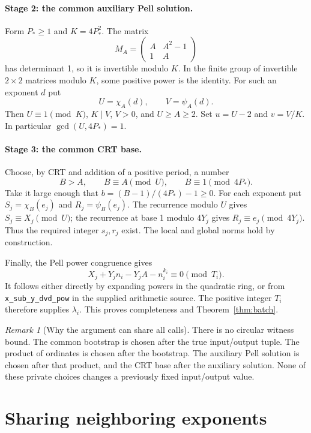 \documentclass[11pt]{article}
\theoremstyle{definition}
\theoremstyle{remark}
\newtheorem{remark}[theorem]{Remark}
\newcommand{\File}[1]{\nolinkurl{#1}}
\begin{document}
\paragraph{Stage 2: the common auxiliary Pell solution.}
Form $P_*\ge1$ and $K=4P_*^2$. The matrix
\[
 M_A=\begin{pmatrix} A&A^2-1\\1&A\end{pmatrix}
\]
has determinant 1, so it is invertible modulo $K$. In the finite group
of invertible $2\times2$ matrices modulo $K$, some positive power is
the identity. For such an exponent $d$ put
\[
 U=\chi_A(d),\qquad V=\psi_A(d).
\]
Then $U\equiv1\pmod K$, $K\mid V$, $V>0$, and $U\ge A\ge2$.
Set $u=U-2$ and $v=V/K$. In particular
$\gcd(U,4P_*)=1$.

\paragraph{Stage 3: the common CRT base.}
Choose, by CRT and addition of a positive period, a number
\[
 B>A,\qquad B\equiv A\pmod U,\qquad B\equiv1\pmod{4P_*}.
\]
Take it large enough that $b=(B-1)/(4P_*)-1\ge0$.
For each exponent put $S_j=\chi_B(e_j)$ and $R_j=\psi_B(e_j)$.
The recurrence modulo $U$ gives $S_j\equiv X_j\pmod U$;
the recurrence at base 1 modulo $4Y_j$ gives
$R_j\equiv e_j\pmod{4Y_j}$. Thus the required integer $s_j,r_j$
exist. The local and global norms hold by construction.

Finally, the Pell power congruence gives
\[
 X_j+Y_jn_i-Y_jA-n_i^{k_i}\equiv0\pmod{T_i}.
\]
It follows either directly by expanding powers in the quadratic ring,
or from \File{x_sub_y_dvd_pow} in the supplied arithmetic source.
The positive integer $T_i$ therefore supplies $\lambda_i$.
This proves completeness and Theorem~\ref{thm:batch}.

\begin{remark}[Why the argument can share all calls]
There is no circular witness bound. The common bootstrap is chosen after
the true input/output tuple. The product of ordinates is chosen after
the bootstrap. The auxiliary Pell solution is chosen after that product,
and the CRT base after the auxiliary solution. None of these private
choices changes a previously fixed input/output value.
\end{remark}

\section{Sharing neighboring exponents}\label{sec:recurrence}
\end{document}
